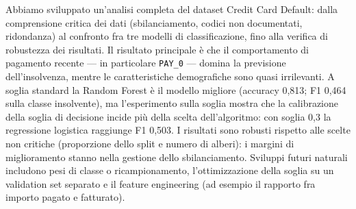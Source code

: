 \documentclass[11pt,a4paper]{article}
\begin{document}
Abbiamo sviluppato un'analisi completa del dataset Credit Card Default: dalla comprensione critica dei dati (sbilanciamento, codici non documentati, ridondanza) al confronto fra tre modelli di classificazione, fino alla verifica di robustezza dei risultati. Il risultato principale \`e che il comportamento di pagamento recente --- in particolare \texttt{PAY\_0} --- domina la previsione dell'insolvenza, mentre le caratteristiche demografiche sono quasi irrilevanti. A soglia standard la Random Forest \`e il modello migliore (accuracy 0,813; F1 0,464 sulla classe insolvente), ma l'esperimento sulla soglia mostra che la calibrazione della soglia di decisione incide pi\`u della scelta dell'algoritmo: con soglia 0,3 la regressione logistica raggiunge F1 0,503. I risultati sono robusti rispetto alle scelte non critiche (proporzione dello split e numero di alberi): i margini di miglioramento stanno nella gestione dello sbilanciamento. Sviluppi futuri naturali includono pesi di classe o ricampionamento, l'ottimizzazione della soglia su un validation set separato e il feature engineering (ad esempio il rapporto fra importo pagato e fatturato).

\nocite{uci}


\end{document}
